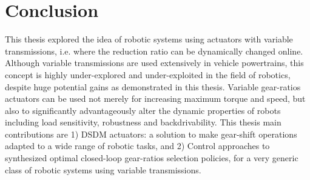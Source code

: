 \chapter{Conclusion}
\label{sec:Conclusion}








This thesis explored the idea of robotic systems using actuators with variable transmissions, i.e. where the reduction ratio can be dynamically changed online. Although variable transmissions are used extensively in vehicle powertrains, this concept is highly under-explored and under-exploited in the field of robotics, despite huge potential gains as demonstrated in this thesis. Variable gear-ratios actuators can be used not merely for increasing maximum torque and speed, but also to significantly advantageously alter the dynamic properties of robots including load sensitivity, robustness and backdrivability. This thesis main contributions are 1) DSDM actuators: a solution to make gear-shift operations adapted to a wide range of robotic tasks, and 2) Control approaches to synthesized optimal closed-loop gear-ratios selection policies, for a very generic class of robotic systems using variable transmissions.

